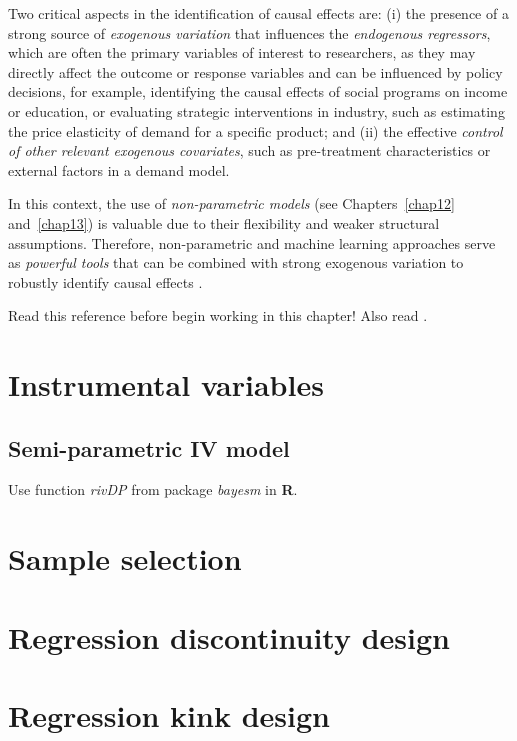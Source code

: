 Two critical aspects in the identification of causal effects are: (i) the presence of a strong source of \textit{exogenous variation} that influences the \textit{endogenous regressors}, which are often the primary variables of interest to researchers, as they may directly affect the outcome or response variables and can be influenced by policy decisions, for example, identifying the causal effects of social programs on income or education, or evaluating strategic interventions in industry, such as estimating the price elasticity of demand for a specific product; and (ii) the effective \textit{control of other relevant exogenous covariates}, such as pre-treatment characteristics or external factors in a demand model.

In this context, the use of \textit{non-parametric models} (see Chapters~\ref{chap12} and~\ref{chap13}) is valuable due to their flexibility and weaker structural assumptions. Therefore, non-parametric and machine learning approaches serve as \textit{powerful tools} that can be combined with strong exogenous variation to robustly identify causal effects \cite{chernozhukov2018double,chernozhukov2024applied}.


Read this reference \cite{iacovone2023bayesian} before begin working in this chapter! Also read \cite{imbens1997bayesian}.


\section{Instrumental variables}\label{sec12_1}
\subsection{Semi-parametric IV model}\label{sec12_11}
Use function \textit{rivDP} from package \textit{bayesm} in \textbf{R}.

\section{Sample selection}\label{sec12_2}
\cite{greenberg2012introduction}

\section{Regression discontinuity design}\label{sec12_3}
\cite{chib2016bayesian,chib2023nonparametric,kowalska2024bayesian}

\section{Regression kink design}\label{sec12_4}
\cite{chan2025minimum}

